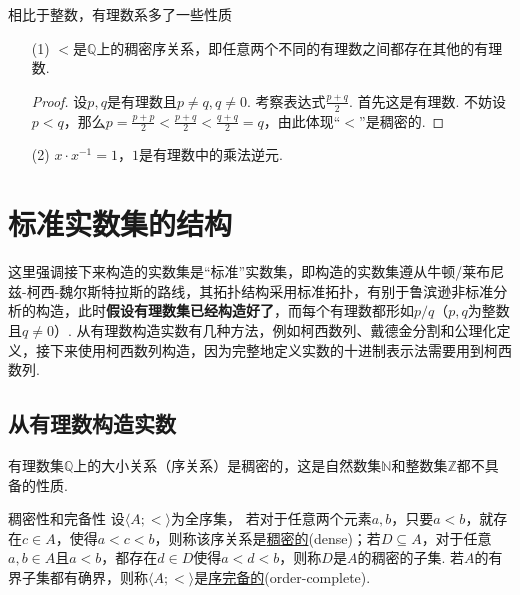 \documentclass[main.tex]{subfiles}
\begin{document}
相比于整数，有理数系多了一些性质
\begin{itemize}
    \item [(1)] \(<\)是\(\mathbb{Q}\)上的稠密序关系，即任意两个不同的有理数之间都存在其他的有理数.
    \begin{proof}
        设\(p,q\)是有理数且\(p\neq q,q \neq 0\). 考察表达式\(\frac{p+q}{2}\). 首先这是有理数. 不妨设\(p<q\)，那么\(p = \frac{p+p}{2} < \frac{p+q}{2} < \frac{q+q}{2} = q\)，由此体现“\(<\)”是稠密的.
    \end{proof}
    \item [(2)] \(x \cdot x^{-1} = 1\)，\(1\)是有理数中的乘法逆元.
\end{itemize}

\section{标准实数集的结构}

这里强调接下来构造的实数集是“标准”实数集，即构造的实数集遵从牛顿/莱布尼兹-柯西-魏尔斯特拉斯的路线，其拓扑结构采用标准拓扑，有别于鲁滨逊非标准分析的构造，此时\textbf{假设有理数集已经构造好了}，而每个有理数都形如\(p/q\)（\(p,q\)为整数且\(q \neq 0\)）. 从有理数构造实数有几种方法，例如柯西数列、戴德金分割和公理化定义，接下来使用柯西数列构造，因为完整地定义实数的十进制表示法需要用到柯西数列.


\subsection{从有理数构造实数}

有理数集\(\mathbb{Q}\)上的大小关系（序关系）是稠密的，这是自然数集\(\mathbb{N}\)和整数集\(\mathbb{Z}\)都不具备的性质.

\begin{definition}{稠密性和完备性}
    设\(\langle A; < \rangle\)为全序集，
    \newline
    若对于任意两个元素\(a,b\)，只要\(a<b\)，就存在\(c \in A\)，使得\(a<c<b\)，则称该序关系是\uline{稠密的}(dense)；若\(D \subseteq A\)，对于任意\(a,b \in A\)且\(a<b\)，都存在\(d \in D\)使得\(a<d<b\)，则称\(D\)是\(A\)的稠密的子集.
    \newline
    若\(A\)的有界子集都有确界，则称\(\langle A; < \rangle\)是\uline{序完备的}(order-complete).
\end{definition}
\end{document}
